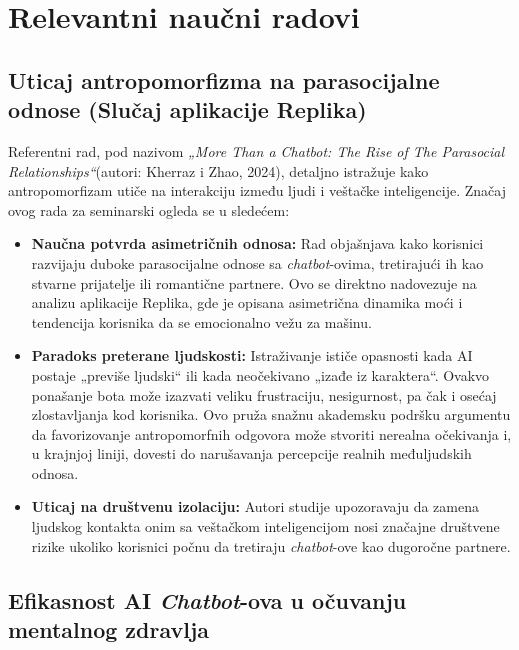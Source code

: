 \documentclass{article}
\begin{document}
\section{Relevantni naučni radovi}

\subsection{Uticaj antropomorfizma na parasocijalne odnose (Slučaj aplikacije Replika)}

Referentni rad, pod nazivom \textit{„More Than a Chatbot: The Rise of The Parasocial Relationships“}(autori: Kherraz i Zhao, 2024), detaljno istražuje kako antropomorfizam utiče na interakciju između ljudi i veštačke inteligencije. Značaj ovog rada za seminarski ogleda se u sledećem:  
\begin{itemize}
    \item \textbf{Naučna potvrda asimetričnih odnosa:} Rad objašnjava kako korisnici razvijaju duboke parasocijalne odnose sa \textit{chatbot}-ovima, tretirajući ih kao stvarne prijatelje ili romantične partnere. Ovo se direktno nadovezuje na analizu aplikacije Replika, gde je opisana asimetrična dinamika moći i tendencija korisnika da se emocionalno vežu za mašinu.
    \item \textbf{Paradoks preterane ljudskosti:} Istraživanje ističe opasnosti kada AI postaje „previše ljudski“ ili kada neočekivano „izađe iz karaktera“. Ovakvo ponašanje bota može izazvati veliku frustraciju, nesigurnost, pa čak i osećaj zlostavljanja kod korisnika. Ovo pruža snažnu akademsku podršku argumentu da favorizovanje antropomorfnih odgovora može stvoriti nerealna očekivanja i, u krajnjoj liniji, dovesti do narušavanja percepcije realnih međuljudskih odnosa.
    \item \textbf{Uticaj na društvenu izolaciju:} Autori studije upozoravaju da zamena ljudskog kontakta onim sa veštačkom inteligencijom nosi značajne društvene rizike ukoliko korisnici počnu da tretiraju \textit{chatbot}-ove kao dugoročne partnere.
\end{itemize}

\subsection{Efikasnost AI \textit{Chatbot}-ova u očuvanju mentalnog zdravlja}
\end{document}
